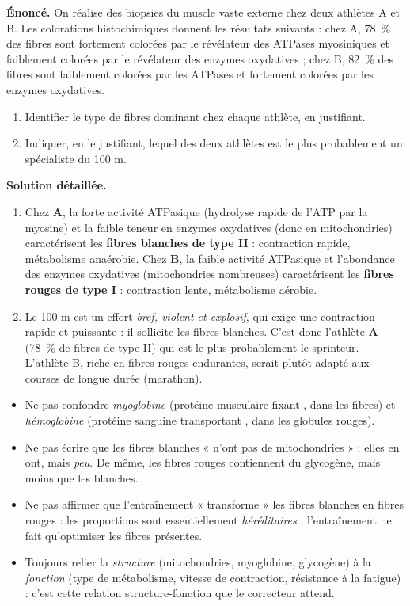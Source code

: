 \documentclass[11pt]{article}
\begin{document}
\begin{exoresolu}
\textbf{Énoncé.} On réalise des biopsies du muscle vaste externe chez deux athlètes A et B. Les colorations histochimiques donnent les résultats suivants : chez A, \SI{78}{\%} des fibres sont fortement colorées par le révélateur des ATPases myosiniques et faiblement colorées par le révélateur des enzymes oxydatives ; chez B, \SI{82}{\%} des fibres sont faiblement colorées par les ATPases et fortement colorées par les enzymes oxydatives.
\begin{enumerate}
\item Identifier le type de fibres dominant chez chaque athlète, en justifiant.
\item Indiquer, en le justifiant, lequel des deux athlètes est le plus probablement un spécialiste du 100 m.
\end{enumerate}
\tcblower
\textbf{Solution détaillée.}
\begin{enumerate}
\item Chez \textbf{A}, la forte activité ATPasique (hydrolyse rapide de l'ATP par la myosine) et la faible teneur en enzymes oxydatives (donc en mitochondries) caractérisent les \textbf{fibres blanches de type II} : contraction rapide, métabolisme anaérobie. Chez \textbf{B}, la faible activité ATPasique et l'abondance des enzymes oxydatives (mitochondries nombreuses) caractérisent les \textbf{fibres rouges de type I} : contraction lente, métabolisme aérobie.
\item Le 100 m est un effort \emph{bref, violent et explosif}, qui exige une contraction rapide et puissante : il sollicite les fibres blanches. C'est donc l'athlète \textbf{A} (\SI{78}{\%} de fibres de type II) qui est le plus probablement le sprinteur. L'athlète B, riche en fibres rouges endurantes, serait plutôt adapté aux courses de longue durée (marathon).
\end{enumerate}
\end{exoresolu}

\begin{attention}
\begin{itemize}
\item Ne pas confondre \emph{myoglobine} (protéine musculaire fixant , dans les fibres) et \emph{hémoglobine} (protéine sanguine transportant , dans les globules rouges).
\item Ne pas écrire que les fibres blanches « n'ont pas de mitochondries » : elles en ont, mais \emph{peu}. De même, les fibres rouges contiennent du glycogène, mais moins que les blanches.
\item Ne pas affirmer que l'entraînement « transforme » les fibres blanches en fibres rouges : les proportions sont essentiellement \emph{héréditaires} ; l'entraînement ne fait qu'optimiser les fibres présentes.
\item Toujours relier la \emph{structure} (mitochondries, myoglobine, glycogène) à la \emph{fonction} (type de métabolisme, vitesse de contraction, résistance à la fatigue) : c'est cette relation structure-fonction que le correcteur attend.
\end{itemize}
\end{attention}
\end{document}
